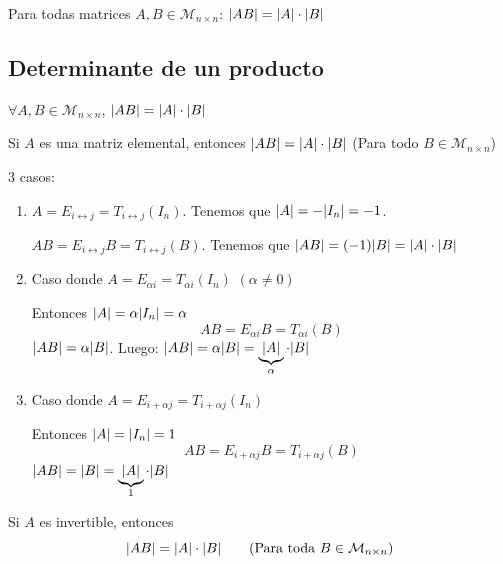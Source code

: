 \documentclass[11pt,a4paper]{article}
\newcommand{\M}{\mathcal{M}}
\begin{document}
\begin{teorema}
Para todas matrices $A,B\in\M_{n\times n}$: $\lvert AB\rvert=\lvert A\rvert\cdot\lvert B\rvert$
\end{teorema}


\subsection{Determinante de un producto}

\begin{teorema}
$\forall A,B\in\M_{n\times n}$, \quad $\lvert AB\rvert=\lvert A\rvert\cdot\lvert B\rvert$
\end{teorema}

\begin{lema}\label{lema:elemental}
Si $A$ es una matriz elemental, entonces $\lvert AB\rvert=\lvert A\rvert\cdot\lvert B\rvert$ \hfill (Para todo $B\in\M_{n\times n}$)
\end{lema}

\begin{demo}
3 casos:
\begin{enumerate}[label=(\arabic*)]
  \item $A=E_{i\leftrightarrow j}=T_{i\leftrightarrow j}(I_n)$. Tenemos que $\lvert A\rvert=-\lvert I_n\rvert=-1$.

  $AB=E_{i\leftrightarrow j}B=T_{i\leftrightarrow j}(B)$. Tenemos que $\lvert AB\rvert=(-1)\lvert B\rvert=\lvert A\rvert\cdot\lvert B\rvert$
  \item Caso donde $A=E_{\alpha i}=T_{\alpha i}(I_n)$ \quad $(\alpha\neq0)$

  Entonces $\lvert A\rvert=\alpha\lvert I_n\rvert=\alpha$
  \[
  AB=E_{\alpha i}B=T_{\alpha i}(B)
  \]
  $\lvert AB\rvert=\alpha\lvert B\rvert$. \qquad Luego: $\lvert AB\rvert=\alpha\lvert B\rvert=\underbrace{\lvert A\rvert}_{\alpha}\cdot\lvert B\rvert$
  \item Caso donde $A=E_{i+\alpha j}=T_{i+\alpha j}(I_n)$

  Entonces $\lvert A\rvert=\lvert I_n\rvert=1$
  \[
  AB=E_{i+\alpha j}B=T_{i+\alpha j}(B)
  \]
  $\lvert AB\rvert=\lvert B\rvert=\underbrace{\lvert A\rvert}_{1}\cdot\lvert B\rvert$
\end{enumerate}
\end{demo}

\begin{lema}\label{lema:invertible}
Si $A$ es invertible, entonces
\[
\abs{AB}=\abs{A}\cdot\abs{B}\qquad(\text{Para toda } B\in\M_{n\times n})
\]
\end{lema}
\end{document}
